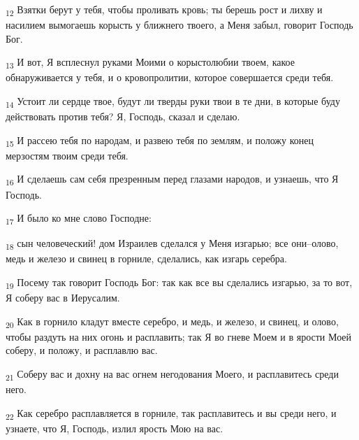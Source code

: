 \begin{tcolorbox}
\textsubscript{12} Взятки берут у тебя, чтобы проливать кровь; ты берешь рост и лихву и насилием вымогаешь корысть у ближнего твоего, а Меня забыл, говорит Господь Бог.
\end{tcolorbox}
\begin{tcolorbox}
\textsubscript{13} И вот, Я всплеснул руками Моими о корыстолюбии твоем, какое обнаруживается у тебя, и о кровопролитии, которое совершается среди тебя.
\end{tcolorbox}
\begin{tcolorbox}
\textsubscript{14} Устоит ли сердце твое, будут ли тверды руки твои в те дни, в которые буду действовать против тебя? Я, Господь, сказал и сделаю.
\end{tcolorbox}
\begin{tcolorbox}
\textsubscript{15} И рассею тебя по народам, и развею тебя по землям, и положу конец мерзостям твоим среди тебя.
\end{tcolorbox}
\begin{tcolorbox}
\textsubscript{16} И сделаешь сам себя презренным перед глазами народов, и узнаешь, что Я Господь.
\end{tcolorbox}
\begin{tcolorbox}
\textsubscript{17} И было ко мне слово Господне:
\end{tcolorbox}
\begin{tcolorbox}
\textsubscript{18} сын человеческий! дом Израилев сделался у Меня изгарью; все они--олово, медь и железо и свинец в горниле, сделались, как изгарь серебра.
\end{tcolorbox}
\begin{tcolorbox}
\textsubscript{19} Посему так говорит Господь Бог: так как все вы сделались изгарью, за то вот, Я соберу вас в Иерусалим.
\end{tcolorbox}
\begin{tcolorbox}
\textsubscript{20} Как в горнило кладут вместе серебро, и медь, и железо, и свинец, и олово, чтобы раздуть на них огонь и расплавить; так Я во гневе Моем и в ярости Моей соберу, и положу, и расплавлю вас.
\end{tcolorbox}
\begin{tcolorbox}
\textsubscript{21} Соберу вас и дохну на вас огнем негодования Моего, и расплавитесь среди него.
\end{tcolorbox}
\begin{tcolorbox}
\textsubscript{22} Как серебро расплавляется в горниле, так расплавитесь и вы среди него, и узнаете, что Я, Господь, излил ярость Мою на вас.
\end{tcolorbox}
